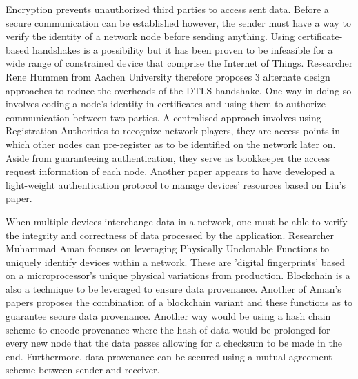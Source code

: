 \documentclass[14]{article}
\begin{document}
Encryption prevents unauthorized third parties to access sent data. Before a secure communication can be established however, the sender must have a way to verify the identity of a network node before sending anything. Using certificate-based handshakes\cite{hummen2014delegation} is a possibility but it has been proven to be infeasible for a wide range of constrained device that comprise the Internet of Things. Researcher Rene Hummen from Aachen University therefore proposes 3 alternate design approaches\cite{hummen2013towards} to reduce the overheads of the DTLS handshake. One way in doing so involves coding a node's identity in certificates and using them to authorize communication between two parties. 
A centralised approach involves using Registration Authorities\cite{liu2012authentication} to recognize network players, they are access points in which other nodes can pre-register as to be identified on the network later on. Aside from guaranteeing authentication, they serve as bookkeeper the access request information of each node. Another paper\cite{jan2014robust} appears to have developed a light-weight authentication protocol to manage devices' resources based on Liu's paper. 

When multiple devices interchange data in a network, one must be able to verify the integrity and correctness of data processed by the application. Researcher Muhammad Aman focuses on leveraging Physically Unclonable Functions \cite{aman2017secure} to uniquely identify devices within a network. These are 'digital fingerprints' based on a microprocessor's unique physical variations from production. Blockchain is a also a technique to be leveraged to ensure data provenance. Another of Aman's papers\cite{javaid2018blockpro} proposes the combination of a blockchain variant and these functions as to guarantee secure data provenance.
Another way would be using a hash chain scheme\cite{suhail2018data} to encode provenance where the hash of data would be prolonged for every new node that the data passes allowing for a checksum to be made in the end. Furthermore, data provenance can be secured using a mutual agreement scheme\cite{rangwala2016mutual} between sender and receiver.
\end{document}
